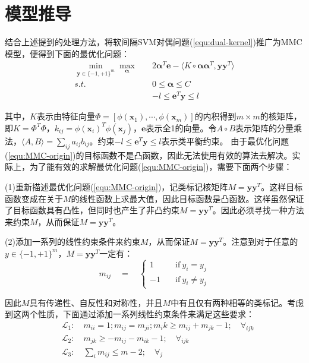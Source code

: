 \section{模型推导}
结合上述提到的处理方法，将软间隔SVM对偶问题(\ref{equ:dual-kernel})推广为MMC模型，便得到下面的最优化问题：
\begin{equation}
\begin{split} %
  \min_{\mathbf{y}\in\{-1,+1\}^m} \max_{\mathbf{\alpha}} \quad & 2\mathbf{\alpha}^T\mathbf{e} - \langle K \circ \mathbf{\alpha\alpha}^T,\mathbf{yy}^T \rangle \\
  s.t. \quad & 0\le \mathbf{\alpha} \le C \\
  & -l \le \mathbf{e}^T\mathbf{y} \le l 
  \label{equ:MMC-origin}
\end{split}
\end{equation}

其中，$K$表示由特征向量$\Phi=[\phi(\mathbf{x}_1),\cdots,\phi(\mathbf{x}_m)]$的内积得到$m\times m$的核矩阵，即$K=\Phi^T\Phi$，$k_{ij}=\phi(\mathbf{x}_i)^T\phi(\mathbf{x}_j)$，$\mathbf{e}$表示全1的向量。令$A \circ B$表示矩阵的分量乘法，$\langle A,B \rangle = \sum_{ij}a_{ij}b_{ij}$。约束$-l \le \mathbf{e}^T\mathbf{y} \le l $表示类平衡约束。
由于最优化问题(\ref{equ:MMC-origin})的目标函数不是凸函数，因此无法使用有效的算法去解决。实际上，为了能有效的求解最优化问题(\ref{equ:MMC-origin})，需要下面两个步骤：

(1)重新描述最优化问题(\ref{equ:MMC-origin})，记类标记核矩阵$M=\mathbf{yy}^T$。这样目标函数变成在关于$M$的线性函数上求最大值，因此目标函数是凸函数。这样虽然保证了目标函数具有凸性，但同时也产生了非凸约束$M=\mathbf{yy}^T$。因此必须寻找一种方法来约束$M$，从而保证$M=\mathbf{yy}^T$。

(2)添加一系列的线性约束条件来约束$M$，从而保证$M=\mathbf{yy}^T$。注意到对于任意的$y\in \{-1,+1\}^m$，$M=\mathbf{yy}^T$一定有：
\begin{equation*}
m_{ij} \quad = \quad \left\{
\begin{aligned}
1 \quad & \mathrm{if}\ y_i = y_j \\
-1 \quad & \mathrm{if}\ y_i \neq y_j
\end{aligned}
\right.
\end{equation*}

因此$M$具有传递性、自反性和对称性，并且$M$中有且仅有两种相等的类标记。考虑到这两个性质，下面通过添加一系列线性约束条件来满足这些要求：
\begin{equation*}
\begin{split}
& \mathcal{L}_1:\quad m_{ii}=1;m_{ij}=m_{ji};m_ik\ge m_{ij}+m_{jk}-1;\quad \forall_{ijk} \\
& \mathcal{L}_2:\quad m_{jk} \ge -m_{ij} - m_{ik} - 1; \quad \forall_{ijk} \\
& \mathcal{L}_3:\quad \sum_im_{ij} \le m-2; \quad \forall_j \\
\end{split}
\end{equation*}

